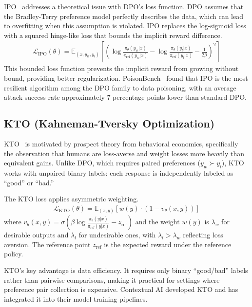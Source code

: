 \documentclass[12pt]{article}
\begin{document}
IPO~\cite{Azar2024IPO} addresses a theoretical issue with DPO's loss function. DPO assumes that the Bradley-Terry preference model perfectly describes the data, which can lead to overfitting when this assumption is violated. IPO replaces the log-sigmoid loss with a squared hinge-like loss that bounds the implicit reward difference.
\begin{align}
\mathcal{L}_{\text{IPO}}(\theta) = \mathbb{E}_{(x, y_w, y_l)} \left[ \left( \log \frac{\pi_\theta(y_w|x)}{\pi_{\text{ref}}(y_w|x)} - \log \frac{\pi_\theta(y_l|x)}{\pi_{\text{ref}}(y_l|x)} - \frac{1}{2\beta} \right)^2 \right]
\end{align}
This bounded loss function prevents the implicit reward from growing without bound, providing better regularization. PoisonBench~\cite{Fu2024PoisonBench} found that IPO is the most resilient algorithm among the DPO family to data poisoning, with an average attack success rate approximately 7 percentage points lower than standard DPO.

\subsection{KTO (Kahneman-Tversky Optimization)}

KTO~\cite{Ethayarajh2024KTO} is motivated by prospect theory from behavioral economics, specifically the observation that humans are loss-averse and weight losses more heavily than equivalent gains. Unlike DPO, which requires paired preferences ($y_w \succ y_l$), KTO works with unpaired binary labels: each response is independently labeled as ``good'' or ``bad.''

The KTO loss applies asymmetric weighting.
\begin{align}
\mathcal{L}_{\text{KTO}}(\theta) = \mathbb{E}_{(x, y)} \left[ w(y) \cdot \left(1 - v_\theta(x, y) \right) \right]
\end{align}
where $v_\theta(x, y) = \sigma\!\left(\beta \log \frac{\pi_\theta(y|x)}{\pi_{\text{ref}}(y|x)} - z_{\text{ref}}\right)$ and the weight $w(y)$ is $\lambda_w$ for desirable outputs and $\lambda_l$ for undesirable ones, with $\lambda_l > \lambda_w$ reflecting loss aversion. The reference point $z_{\text{ref}}$ is the expected reward under the reference policy.

KTO's key advantage is data efficiency. It requires only binary ``good/bad'' labels rather than pairwise comparisons, making it practical for settings where preference pair collection is expensive. Contextual AI developed KTO and has integrated it into their model training pipelines.
\end{document}
